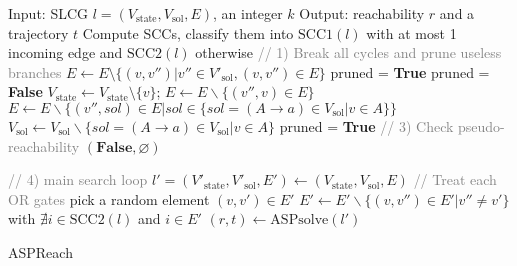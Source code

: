 \begin{algorithm}[ht]
\begin{algorithmic}
    \State Input: SLCG $l=(V_{\mathrm{state}},V_{\mathrm{sol}}, E)$, an integer $k$
    \State Output: reachability $r$ and a trajectory $t$
    \State Compute SCCs, classify them into $\mathrm{SCC1}(l)$ with at most 1 incoming edge and $\mathrm{SCC2}(l)$ otherwise
    \State \textcolor{gray}{// 1) Break all cycles and prune useless branches}\label{delete_cycle_begin}
            \State $E\gets E\setminus \{(v,v'')|v''\in V'_{\mathrm{sol}},(v,v'')\in E\}$
        \EndIf
    \EndFor
    \EndFor \label{delete_cycle_end}
    \State{\textcolor{gray}{// 2) remove useless nodes/edges}} \label{prune_begin}
    \State pruned = \textbf{True}
        \State pruned = \textbf{False}
                \State $V_{\mathrm{state}} \gets V_{\mathrm{state}}\setminus \{v\}$; $E\gets E\backslash \{ (v'',v)\in E\}$
                \State $E\gets E\backslash \{ (v'',sol)\in E | sol \in \{sol = (A \rightarrow a) \in V_{\mathrm{sol}} | v \in A\}\}$
                \State $V_{\mathrm{sol}} \gets V_{\mathrm{sol}}\backslash \{sol = (A \rightarrow a) \in V_{\mathrm{sol}} | v \in A\}$
                \State pruned = \textbf{True}
            \EndIf
        \EndFor \label{prune_end}
    \EndWhile
    \State \textcolor{gray}{// 3) Check pseudo-reachability} \label{pseudo_reach_begin}
        \State \Return $(\mathbf{False},\varnothing)$
    \EndIf \label{pseudo_reach_end}
    
    \State \textcolor{gray}{// 4) main search loop} \label{main_loop_begin}
        \State $l'=(V'_{\mathrm{state}}, V'_{\mathrm{sol}},E')\gets(V_{\mathrm{state}}, V_{\mathrm{sol}},E)$ 
         \textcolor{gray}{// Treat each OR gates}
            \State pick a random element $(v,v') \in E'$
            \State $E'\gets E' \backslash  \{(v,v'') \in E'| v''\neq v'\}$ with $\nexists i\in \mathrm{SCC2}(l)$ and $i\in E'$
        \EndFor
        \State $(r,t)\gets\mathrm{ASPsolve}(l')$
            \State{}
        \EndIf
    \EndFor \label{main_loop_end}
    \State {}
\end{algorithmic}
\caption{ASPReach}\label{algOverall}
\end{algorithm}

